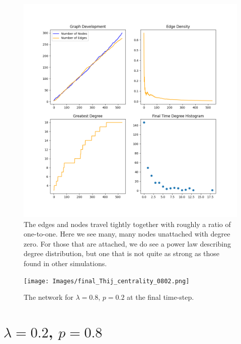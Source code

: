 \begin{figure}[h!]
    \includegraphics[width=14cm]{Images/twitter_sim_stats_3_0.8_0.2.png}
    \centering
    \caption{The edges and nodes travel tightly together with roughly a ratio of 
     one-to-one. Here we see many, many nodes unattached with degree zero.
    For those that are attached, we do see a power law describing degree distribution, but one that is not quite
    as strong as those found in other simulations.}
    \label{fig:stats0802}
\end{figure}


\begin{figure}[h!]
    \texttt{[image: Images/final\_Thij\_centrality\_0802.png]}
    \centering
    \caption{The network for $\lambda=0.8$, $p=0.2$ at the final time-step.}
    \label{fig:network0802}
\end{figure}

\clearpage

\section{$\lambda=0.2$, $p=0.8$}

